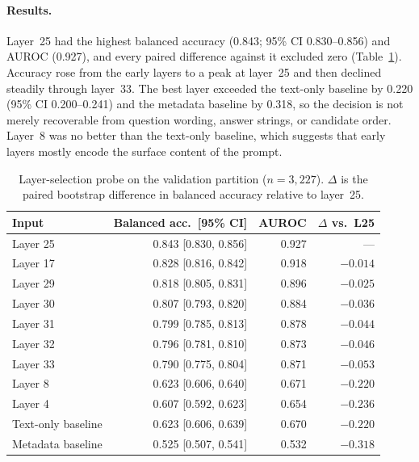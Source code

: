 \paragraph{Results.} Layer~25 had the highest balanced accuracy (0.843;
95\% CI 0.830--0.856) and AUROC (0.927), and every paired difference against
it excluded zero (Table~\ref{tab:layer-selection}). Accuracy rose from the
early layers to a peak at layer~25 and then declined steadily through
layer~33. The best layer exceeded the text-only baseline by 0.220 (95\% CI
0.200--0.241) and the metadata baseline by 0.318, so the decision is not merely
recoverable from question wording, answer strings, or candidate order. Layer~8
was no better than the text-only baseline, which suggests that early layers
mostly encode the surface content of the prompt.

\begin{table}[htbp]
    \centering
    \caption{Layer-selection probe on the validation partition ($n=3{,}227$).
    $\Delta$ is the paired bootstrap difference in balanced accuracy relative
    to layer~25.}
    \label{tab:layer-selection}
    \begin{tabular}{lrrr}
        \toprule
        Input & Balanced acc.\ [95\% CI] & AUROC & $\Delta$ vs.\ L25 \\
        \midrule
        Layer 25 & 0.843 [0.830, 0.856] & 0.927 & --- \\
        Layer 17 & 0.828 [0.816, 0.842] & 0.918 & $-0.014$ \\
        Layer 29 & 0.818 [0.805, 0.831] & 0.896 & $-0.025$ \\
        Layer 30 & 0.807 [0.793, 0.820] & 0.884 & $-0.036$ \\
        Layer 31 & 0.799 [0.785, 0.813] & 0.878 & $-0.044$ \\
        Layer 32 & 0.796 [0.781, 0.810] & 0.873 & $-0.046$ \\
        Layer 33 & 0.790 [0.775, 0.804] & 0.871 & $-0.053$ \\
        Layer 8 & 0.623 [0.606, 0.640] & 0.671 & $-0.220$ \\
        Layer 4 & 0.607 [0.592, 0.623] & 0.654 & $-0.236$ \\
        Text-only baseline & 0.623 [0.606, 0.639] & 0.670 & $-0.220$ \\
        Metadata baseline & 0.525 [0.507, 0.541] & 0.532 & $-0.318$ \\
        \bottomrule
    \end{tabular}
\end{table}

